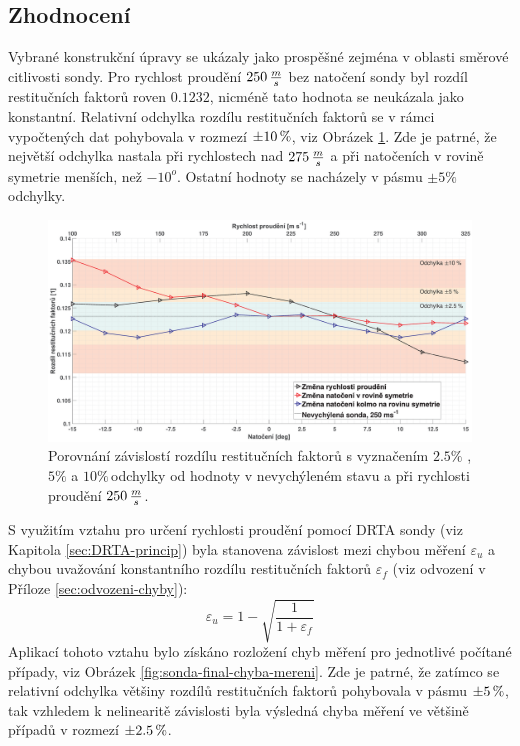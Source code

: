         \newpage
        \subsection{Zhodnocení}

            Vybrané konstrukční úpravy se ukázaly jako prospěšné zejména v oblasti směrové citlivosti sondy. Pro rychlost proudění $250 \, \frac{m}{s}$ bez natočení sondy byl rozdíl restitučních faktorů roven $0.1232$, nicméně tato hodnota se neukázala jako konstantní. Relativní odchylka rozdílu restitučních faktorů se v rámci vypočtených dat pohybovala v rozmezí $\pm10 \, \%$, viz Obrázek \ref{fig:sonda-final-rozdil-restitucnich-faktoru}. Zde je patrné, že největší odchylka nastala při rychlostech nad $275 \, \frac{m}{s}$ a při natočeních v rovině symetrie menších, než $-10^o$. Ostatní hodnoty se nacházely v pásmu $\pm5\%$ odchylky.

            \begin{figure}[ht!]
                \centering
                \includegraphics*[width=\textwidth]{500_FINAL/final_rozdil_restitucnich_faktoru.eps}
                \caption{Porovnání závislostí rozdílu restitučních faktorů s vyznačením $2.5\%$ ,$5\%$ a $10\%$\,odchylky od hodnoty v nevychýleném stavu a při rychlosti proudění $250 \, \frac{m}{s}$.}
                \label{fig:sonda-final-rozdil-restitucnich-faktoru}
            \end{figure}

            

            S využitím vztahu pro určení rychlosti proudění pomocí DRTA sondy (viz \linebreak Kapitola \ref{sec:DRTA-princip}) byla stanovena závislost mezi chybou měření $\varepsilon _u$ a chybou uvažování konstantního rozdílu restitučních faktorů $\varepsilon _f$ (viz odvození v Příloze \ref{sec:odvozeni-chyby}):
            \begin{equation} \label{eq:chyba-mereni}
                \varepsilon _u = 1 - \sqrt{\frac{1}{1 + \varepsilon _f}}
            \end{equation}
            Aplikací tohoto vztahu bylo získáno rozložení chyb měření pro jednotlivé počítané případy, viz Obrázek \ref{fig:sonda-final-chyba-mereni}. Zde je patrné, že zatímco se relativní odchylka většiny rozdílů restitučních faktorů pohybovala v pásmu $\pm5 \, \%$, tak vzhledem k nelinearitě závislosti byla výsledná chyba měření ve většině případů v rozmezí $\pm2.5 \, \%$. 

